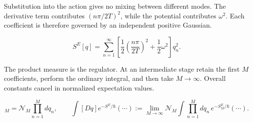 Substitution into the action gives no mixing between different modes.  The
derivative term contributes $(n\pi/2T)^2$, while the potential contributes
$\omega^2$.  Each coefficient is therefore governed by an independent
positive Gaussian.

\begin{equation}
  S^E[q]
  =\sum_{n=1}^{\infty}
  \left[
    \frac12\left(\frac{n\pi}{2T}\right)^2
    +\frac12\omega^2
  \right]q_n^2.
  \label{eq:proposal-diagonal-mode-action}
\end{equation}

The product measure is the regulator.  At an intermediate stage retain the
first $M$ coefficients, perform the ordinary integral, and then take
$M\to\infty$.  Overall constants cancel in normalized expectation values.

\begin{equation}
  [Dq]_M=\mathcal N_M\prod_{n=1}^{M}dq_n,
  \qquad
  \int[Dq]e^{-S^E/\hbar}(\cdots)
  :=\lim_{M\to\infty}
  \mathcal N_M\int\prod_{n=1}^{M}dq_n\,
  e^{-S^E_M/\hbar}(\cdots).
  \label{eq:proposal-mode-regulator}
\end{equation}


